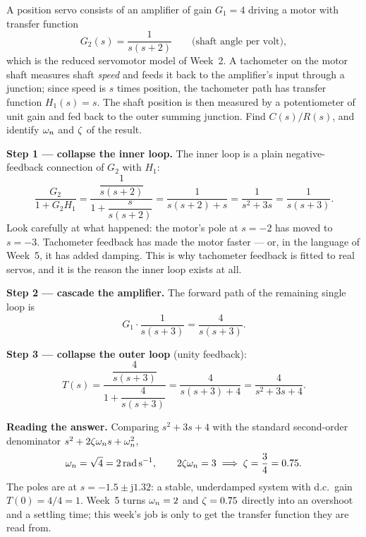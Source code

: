 \documentclass[11pt,a4paper]{article}
\begin{document}
\begin{workedex}[breakable, title=Worked example 4.2 --- a servo with tachometer feedback]
A position servo consists of an amplifier of gain $G_1=4$ driving a motor
with transfer function
\[
  G_2(s)=\frac{1}{s(s+2)}
  \qquad\text{(shaft angle per volt)},
\]
which is the reduced servomotor model of Week~2. A tachometer on the motor
shaft measures shaft \emph{speed} and feeds it back to the amplifier's input
through a junction; since speed is $s$ times position, the tachometer path has
transfer function $H_1(s)=s$. The shaft position is then measured by a
potentiometer of unit gain and fed back to the outer summing junction.
Find $C(s)/R(s)$, and identify $\omega_{n}$ and $\zeta$ of the result.

\medskip
\textbf{Step 1 --- collapse the inner loop.} The inner loop is a plain
negative-feedback connection of $G_2$ with $H_1$:
\[
  \frac{G_2}{1+G_2H_1}
  = \frac{\dfrac{1}{s(s+2)}}{1+\dfrac{s}{s(s+2)}}
  = \frac{1}{s(s+2)+s}
  = \frac{1}{s^{2}+3s}
  = \frac{1}{s(s+3)} .
\]
Look carefully at what happened: the motor's pole at $s=-2$ has moved to
$s=-3$. Tachometer feedback has made the motor faster --- or, in the language
of Week~5, it has added damping. This is why tachometer feedback is fitted to
real servos, and it is the reason the inner loop exists at all.

\medskip
\textbf{Step 2 --- cascade the amplifier.} The forward path of the remaining
single loop is
\[
  G_1\cdot\frac{1}{s(s+3)} = \frac{4}{s(s+3)} .
\]

\medskip
\textbf{Step 3 --- collapse the outer loop} (unity feedback):
\[
  T(s)=\frac{\dfrac{4}{s(s+3)}}{1+\dfrac{4}{s(s+3)}}
   =\frac{4}{s(s+3)+4}
   =\frac{4}{s^{2}+3s+4} .
\]

\medskip
\textbf{Reading the answer.} Comparing $s^{2}+3s+4$ with the standard
second-order denominator $s^{2}+2\zeta\omega_{n} s+\omega_{n}^{2}$,
\[
  \omega_{n}=\sqrt{4}=\SI{2}{\radian\per\second},
  \qquad
  2\zeta\omega_{n}=3 \;\Longrightarrow\; \zeta=\frac{3}{4}=0.75 .
\]
The poles are at $s=-1.5\pm\mathrm{j}1.32$: a stable, underdamped system with
d.c.\ gain $T(0)=4/4=1$. Week~5 turns $\omega_{n}=2$ and $\zeta=0.75$ directly into an
overshoot and a settling time; this week's job is only to get the transfer
function they are read from.
\end{workedex}
\end{document}
